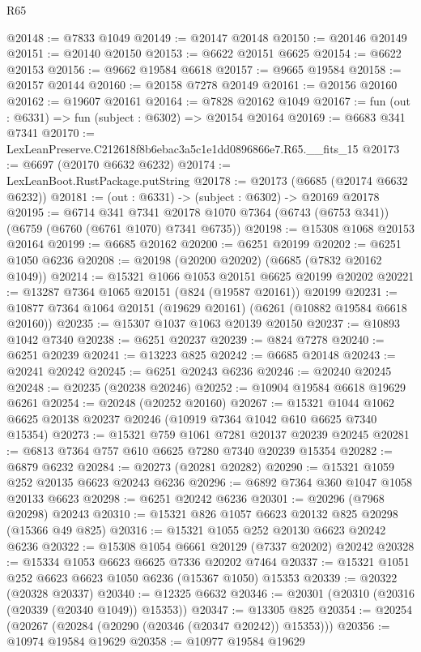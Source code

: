 \begin{lexlean}{R65}
\begin{coremodule}
{@20148 := @7833 @1049
@20149 := @20147 @20148
@20150 := @20146 @20149
@20151 := @20140 @20150
@20153 := @6622 @20151 @6625
@20154 := @6622 @20153
@20156 := @9662 @19584 @6618
@20157 := @9665 @19584
@20158 := @20157 @20144
@20160 := @20158 @7278 @20149
@20161 := @20156 @20160
@20162 := @19607 @20161
@20164 := @7828 @20162 @1049
@20167 := fun (out : @6331) => fun (subject : @6302) => @20154 @20164
@20169 := @6683 @341 @7341
@20170 := LexLeanPreserve.C212618f8b6ebac3a5c1e1dd0896866e7.R65.__fits_15
@20173 := @6697 (@20170 @6632 @6232)
@20174 := LexLeanBoot.RustPackage.putString
@20178 := @20173 (@6685 (@20174 @6632 @6232))
@20181 := (out : @6331) -> (subject : @6302) -> @20169 @20178
@20195 := @6714
    @341
    @7341
    @20178
    @1070
    @7364
    (@6743 (@6753 @341))
    (@6759 (@6760 (@6761 @1070) @7341 @6735))
@20198 := @15308 @1068 @20153 @20164
@20199 := @6685 @20162
@20200 := @6251 @20199
@20202 := @6251 @1050 @6236
@20208 := @20198 (@20200 @20202) (@6685 (@7832 @20162 @1049))
@20214 := @15321 @1066 @1053 @20151 @6625 @20199 @20202
@20221 := @13287 @7364 @1065 @20151 (@824 (@19587 @20161)) @20199
@20231 := @10877 @7364 @1064 @20151 (@19629 @20161) (@6261 (@10882 @19584 @6618 @20160))
@20235 := @15307 @1037 @1063 @20139 @20150
@20237 := @10893 @1042 @7340
@20238 := @6251 @20237
@20239 := @824 @7278
@20240 := @6251 @20239
@20241 := @13223 @825
@20242 := @6685 @20148
@20243 := @20241 @20242
@20245 := @6251 @20243 @6236
@20246 := @20240 @20245
@20248 := @20235 (@20238 @20246)
@20252 := @10904 @19584 @6618 @19629 @6261
@20254 := @20248 (@20252 @20160)
@20267 := @15321 @1044 @1062 @6625 @20138 @20237 @20246 (@10919 @7364 @1042 @610 @6625 @7340 @15354)
@20273 := @15321 @759 @1061 @7281 @20137 @20239 @20245
@20281 := @6813 @7364 @757 @610 @6625 @7280 @7340 @20239 @15354
@20282 := @6879 @6232
@20284 := @20273 (@20281 @20282)
@20290 := @15321 @1059 @252 @20135 @6623 @20243 @6236
@20296 := @6892 @7364 @360 @1047 @1058 @20133 @6623
@20298 := @6251 @20242 @6236
@20301 := @20296 (@7968 @20298) @20243
@20310 := @15321 @826 @1057 @6623 @20132 @825 @20298 (@15366 @49 @825)
@20316 := @15321 @1055 @252 @20130 @6623 @20242 @6236
@20322 := @15308 @1054 @6661 @20129 (@7337 @20202) @20242
@20328 := @15334 @1053 @6623 @6625 @7336 @20202 @7464
@20337 := @15321 @1051 @252 @6623 @6623 @1050 @6236 (@15367 @1050) @15353
@20339 := @20322 (@20328 @20337)
@20340 := @12325 @6632
@20346 := @20301 (@20310 (@20316 (@20339 (@20340 @1049)) @15353))
@20347 := @13305 @825
@20354 := @20254 (@20267 (@20284 (@20290 (@20346 (@20347 @20242)) @15353)))
@20356 := @10974 @19584 @19629
@20358 := @10977 @19584 @19629
}
\end{coremodule}
\end{lexlean}
